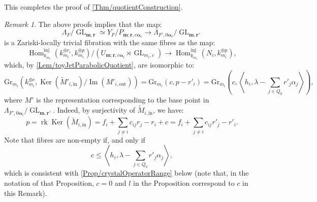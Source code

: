 \documentclass[a4paper,12pt]{article}
\theoremstyle{definition}
\theoremstyle{plain}
\theoremstyle{remark}
\newtheorem{remark}[definition]{Remark}
\DeclareMathOperator{\Ker}{Ker}
\DeclareMathOperator{\GL}{GL}
\DeclareMathOperator{\Hom}{Hom}
\DeclareMathOperator{\Ima}{Im}
\DeclareMathOperator{\rk}{rk}
\newcommand\bfalpha{\bm{\alpha}}
\newcommand\bfm{\mathbf{m}}
\newcommand\bfr{\mathbf{r}}
\begin{document}
This completes the proof of \cref{Thm/quotientConstruction}.

\begin{remark}\label{Rem/fibresRecursiveQuotient}
The above proofs implies that the map:
\[
\Lambda_F/\GL_{\bfm,\bfr}\simeq Y_F/P_{\bfm;\bfr,c\bfalpha_i}\rightarrow\Lambda_{F',0\bfalpha_i}/\GL_{\bfm,\bfr'}
\]
is a Zariski-locally trivial fibration with the same fibres as the map:
\[
\Hom_{k_{m_i}}^{\mathrm{inj}}(k_{m_i}^{\oplus r_i},k_{m_i}^{\oplus p})/(U_{\bfm;\bfr,c\bfalpha_i}\rtimes\GL_{m_i,c})
\rightarrow
\Hom_{k_{m_i}}^{\mathrm{inj}}(N_i,k_{m_i}^{\oplus p}),
\]
which, by \cref{Lem/toyJetParabolicQuotient}, are isomorphic to:
\[
\mathrm{Gr}_{m_i}\left( k_{m_i}^{\oplus c},\Ker(\widetilde{M}'_{i,\mathrm{in}})/\Ima(M'_{i,\mathrm{out}})\right)
=\mathrm{Gr}_{m_i}(c,p-r'_i)
=\mathrm{Gr}_{m_i}\left(c,\left\langle h_i,\lambda-\sum_{j\in Q_0}r'_j\alpha_j\right\rangle\right)
,
\]
where $M'$ is the representation corresponding to the base point in $\Lambda_{F',0\bfalpha_i}/\GL_{\bfm,\bfr'}$. Indeed, by surjectivity of $\widetilde{M}_{i,\mathrm{in}}$, we have:
\[
p=\rk\Ker(\widetilde{M}_{i,\mathrm{in}})=f_i+\sum_{j\ne i}c_{ij}r_j-r_i+c=f_i+\sum_{j\ne i}c_{ij}r'_j-r'_i.
\]
Note that fibres are non-empty if, and only if
\[
c\leq\left\langle h_i,\lambda-\sum_{j\in Q_0}r'_j\alpha_j\right\rangle,
\]
which is consistent with \cref{Prop/crystalOperatorRange} below (note that, in the notation of that Proposition, $c=0$ and $l$ in the Proposition correspond to $c$ in this Remark).
\end{remark}
\end{document}
